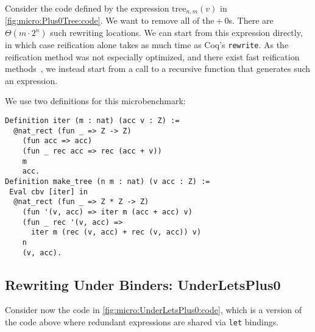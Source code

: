 \documentclass[a4paper,USenglish,cleveref,autoref,thm-restate]{lipics-v2021}
\newcommand{\todo}[1]{\textcolor{red}{\textbf{TODO: #1}}}
\begin{document}
\begin{minipage}[t][1cm]{\textwidth}
Consider the code defined by the expression $\text{tree}_{n,m}(v)$ in \autoref{fig:micro:Plus0Tree:code}.
We want to remove all of the${}+0$s.
There are $\Theta(m \cdot 2^n)$ such rewriting locations.
We can start from this expression directly, in which case reification alone takes as much time as Coq's \texttt{rewrite}.
As the reification method was not especially optimized, and there exist fast reification methods~\cite{ReificationITP18}, we instead start from a call to a recursive function that generates such an expression.


We use two definitions for this microbenchmark:
\begin{verbatim}
Definition iter (m : nat) (acc v : Z) :=
  @nat_rect (fun _ => Z -> Z)
    (fun acc => acc)
    (fun _ rec acc => rec (acc + v))
    m
    acc.
Definition make_tree (n m : nat) (v acc : Z) :=
 Eval cbv [iter] in
  @nat_rect (fun _ => Z * Z -> Z)
    (fun '(v, acc) => iter m (acc + acc) v)
    (fun _ rec '(v, acc) =>
      iter m (rec (v, acc) + rec (v, acc)) v)
    n
    (v, acc).
\end{verbatim}

\subsection{Rewriting Under Binders: UnderLetsPlus0}\label{sec:UnderLetsPlus0-more}\label{sec:micro:UnderLetsPlus0}

Consider now the code in \autoref{fig:micro:UnderLetsPlus0:code}, which is a version of the code above where redundant expressions are shared via \texttt{let} bindings.


\end{minipage}
\end{document}
